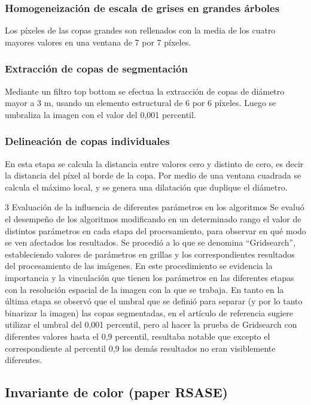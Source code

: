 \subsubsection{Homogeneización de escala de grises en grandes árboles}
Los píxeles de las copas grandes son rellenados con la media de los cuatro mayores valores en una ventana de 7 por 7 píxeles.
\subsubsection{Extracción de copas de segmentación}
Mediante un filtro top bottom se efectua la extracción de copas de diámetro mayor a 3 m, usando un elemento estructural de 6 por 6 píxeles. Luego se umbraliza la imagen con el valor del 0,001 percentil.
\subsubsection{Delineación de copas individuales}
En esta etapa se calcula la distancia entre valores cero y distinto de cero, es decir la distancia del píxel al borde de la copa. Por medio de una ventana cuadrada se calcula el máximo local, y se genera una dilatación que duplique el diámetro.

3 Evaluación de la influencia de diferentes parámetros en los algoritmos Se evaluó el desempeño de los algoritmos modificando en un determinado rango el
valor de distintos parámetros en cada etapa del procesamiento, para observar en qué modo se ven afectados los resultados. Se procedió a lo que se denomina “Gridsearch”, estableciendo valores de parámetros en grillas y los correspondientes resultados del procesamiento de las imágenes. En este procedimiento se evidencia la importancia y la vinculación que tienen los parámetros en las diferentes etapas con la resolución espacial de la imagen con la que se trabaja. En tanto en la última etapa se observó que el umbral
que se definió para separar (y por lo tanto binarizar la imagen) las copas segmentadas, en el artículo de referencia sugiere utilizar el umbral del 0,001 percentil, pero al hacer la prueba de Gridsearch con diferentes valores hasta el 0,9 percentil, resultaba notable que excepto el correspondiente al percentil 0,9 los demás resultados no eran visiblemente diferentes.



\color{cyan} %
\subsection{Invariante de color (paper RSASE)}
